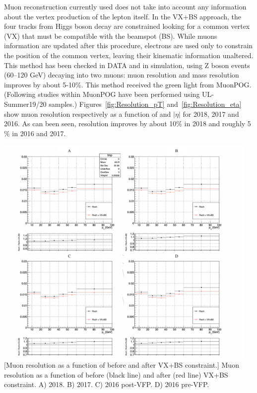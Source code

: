 Muon reconstruction currently used does not take into account any information about the 
vertex production of the lepton itself. %
In the VX+BS approach, the four tracks from Higgs boson decay are constrained looking for a common 
vertex (VX) that must be compatible with the beamspot (BS). 
While muons information are updated after this procedure,
electrons are used only to constrain the position of the common vertex, 
leaving their kinematic information unaltered. \\
This method has been checked in DATA and in simulation, using Z boson events (60--120 GeV)
decaying into two muons: muon \pT resolution and mass resolution improves by about 5-10\%. 
This method received the green light from MuonPOG.\\ 
(Following studies within MuonPOG have been performed using UL-Summer19/20 samples.)
Figures~\ref{fig:Resolution_pT} and~\ref{fig:Resolution_eta} show muon resolution respectively 
as a function of \pT and $|\eta|$ for 2018, 2017 and 2016.
As can been seen, resolution improves by about 10$\%$ in 2018 and roughly 5$\%$ in 2016 and 2017.
\begin{multiFigure}
\begin{center}
	\includegraphics[width=0.96\textwidth]{figures/higgsmassmeas/vxbs/vxbs_muon_pTresol_vs_pT.png}
    [Muon \pT resolution as a function of \pT before and after VX+BS constraint.]
    {Muon \pT resolution as a function of \pT before (black line) and after (red line) VX+BS constraint.
    \;A) 2018.
    \;B) 2017.
    \;C) 2016 post-VFP.
    \;D) 2016 pre-VFP.
    } %
\label{fig:Resolution_pT}
\end{center}
\end{multiFigure}
